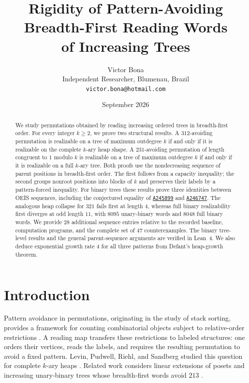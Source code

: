\documentclass[11pt]{article}
\title{Rigidity of Pattern-Avoiding Breadth-First Reading Words\\ of Increasing Trees}
\author{Victor Bona\\[2pt]\small Independent Researcher, Blumenau, Brazil\\\small\texttt{victor.bona@hotmail.com}}
\date{September 2026}
\theoremstyle{definition}
\newcommand{\seq}[1]{\href{https://oeis.org/#1}{\texttt{#1}}}
\begin{document}
\maketitle

\begin{abstract}
We study permutations obtained by reading increasing ordered trees in breadth-first order. For every integer $k\ge2$, we prove two structural results. A $312$-avoiding permutation is realizable on a tree of maximum outdegree $k$ if and only if it is realizable on the complete $k$-ary heap shape. A $231$-avoiding permutation of length congruent to $1$ modulo $k$ is realizable on a tree of maximum outdegree $k$ if and only if it is realizable on a full $k$-ary tree. Both proofs use the nondecreasing sequence of parent positions in breadth-first order. The first follows from a capacity inequality; the second groups nonroot positions into blocks of $k$ and preserves their labels by a pattern-forced inequality. For binary trees these results prove three identities between OEIS sequences, including the conjectured equality of \seq{A245899} and \seq{A246747}. The analogous heap collapse for $321$ fails first at length $4$, whereas full binary realizability first diverges at odd length $11$, with $8095$ unary-binary words and $8048$ full binary words. We provide $28$ additional sequence entries relative to the recorded baseline, computation programs, and the complete set of $47$ counterexamples. The binary tree-level results and the general parent-sequence arguments are verified in Lean~4. We also deduce exponential growth rate $4$ for all three patterns from Defant's heap-growth theorem.
\end{abstract}

\section{Introduction}\label{sec:intro}

Pattern avoidance in permutations, originating in the study of stack sorting, provides a framework for counting combinatorial objects subject to relative-order restrictions \cite{Knuth1997,Bona2012,Kitaev2011}. A reading map transfers these restrictions to labeled structures: one orders their vertices, reads the labels, and requires the resulting permutation to avoid a fixed pattern. Levin, Pudwell, Riehl, and Sandberg studied this question for complete $k$-ary heaps \cite{LPRS2016}. Related work considers linear extensions of posets \cite{AERRSV2016,Defant2019} and increasing unary-binary trees whose breadth-first words avoid $213$ \cite{BFMR2017}.
\end{document}
